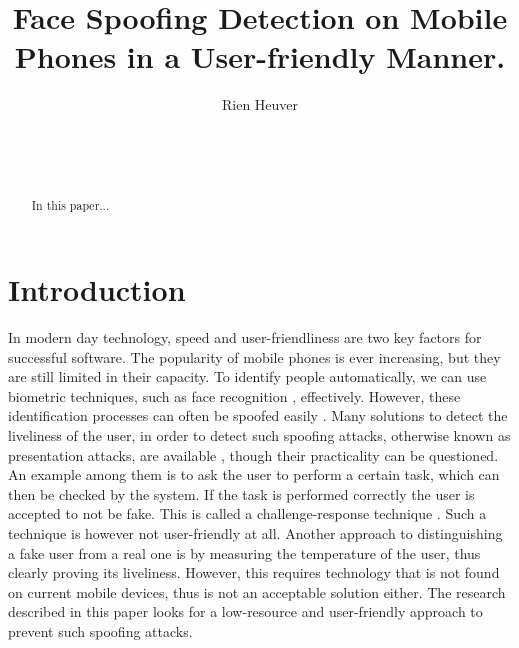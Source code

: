 \documentclass{sig-alternate-br}
\begin{document}
\title{Face Spoofing Detection on Mobile Phones in a User-friendly Manner.}



\author{
\alignauthor
Rien Heuver\\
       \\
       \\
       \\
}

\maketitle

\begin{abstract}
In this paper...
\end{abstract}

\section{Introduction} \label{introduction}
In modern day technology, speed and user-friendliness are two key factors for successful software. The popularity of mobile phones is ever increasing, but they are still limited in their capacity. To identify people automatically, we can use biometric techniques, such as face recognition \cite{zhao2003face}, effectively. However, these identification processes can often be spoofed easily \cite{anjos2014face}. Many solutions to detect the liveliness of the user, in order to detect such spoofing attacks, otherwise known as presentation attacks, are available \cite{bao2009liveness}, though their practicality can be questioned. An example among them is to ask the user to perform a certain task, which can then be checked by the system. If the task is performed correctly the user is accepted to not be fake. This is called a challenge-response technique \cite{bolle2005system}. Such a technique is however not user-friendly at all. Another approach to distinguishing a fake user from a real one is by measuring the temperature of the user, thus clearly proving its liveliness. However, this requires technology that is not found on current mobile devices, thus is not an acceptable solution either. The research described in this paper looks for a low-resource and user-friendly approach to prevent such spoofing attacks.
\end{document}
